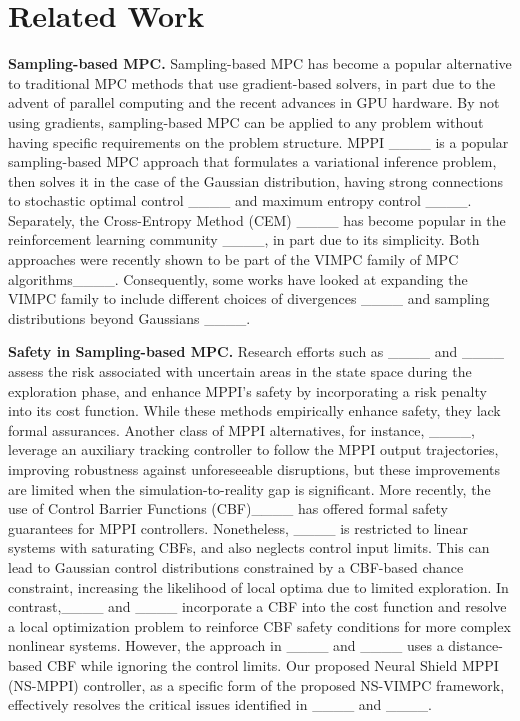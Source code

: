 \section{Related Work}
\noindent\textbf{Sampling-based MPC.} 
Sampling-based MPC has become a popular alternative to traditional MPC methods that use gradient-based solvers, in part due to the advent of parallel computing and the recent advances in GPU hardware.
By not using gradients, sampling-based MPC can be applied to any problem without having specific requirements on the problem structure.
MPPI ____ is a popular sampling-based MPC approach that formulates a variational inference problem, then solves it in the case of the Gaussian distribution, having strong connections to stochastic optimal control ____ and maximum entropy control ____.
Separately, the Cross-Entropy Method (CEM) ____ has become popular in the reinforcement learning community ____, in part due to its simplicity.
Both approaches were recently shown to be part of the VIMPC family of MPC algorithms____. 
Consequently, some works have looked at expanding the VIMPC family to include different choices of divergences ____ and sampling distributions beyond Gaussians ____.

\beforetextbf{}

\noindent\textbf{Safety in Sampling-based MPC.}
Research efforts such as ____ and ____ assess the risk associated with uncertain areas in the state space during the exploration phase, and enhance MPPI's safety by incorporating a risk penalty into its cost function. 
While these methods empirically enhance safety, they lack formal assurances. 
Another class of MPPI alternatives, for instance, ____, leverage an auxiliary tracking controller to follow the MPPI output trajectories, improving robustness against unforeseeable disruptions, but these improvements are limited when the simulation-to-reality gap is significant. 
More recently, the use of Control Barrier Functions (CBF)____ has offered formal safety guarantees for MPPI controllers. 
Nonetheless, ____  is restricted to linear systems with saturating CBFs, and also neglects control input limits. 
This can lead to Gaussian control distributions constrained by a CBF-based chance constraint, increasing the likelihood of local optima due to limited exploration. 
In contrast,____ and ____ incorporate a CBF into the cost function and resolve a local optimization problem to reinforce CBF safety conditions for more complex nonlinear systems. 
However, the approach in ____ and ____ uses a distance-based CBF while ignoring the control limits. Our proposed Neural Shield MPPI (NS-MPPI) controller, as a specific form of the proposed NS-VIMPC framework, effectively resolves the critical issues identified in ____ and ____.

